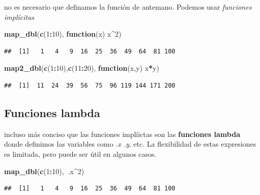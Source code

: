\documentclass[]{book}
\newenvironment{Shaded}{\begin{snugshade}}{\end{snugshade}}
\newcommand{\ControlFlowTok}[1]{\textcolor[rgb]{0.13,0.29,0.53}{\textbf{#1}}}
\newcommand{\DecValTok}[1]{\textcolor[rgb]{0.00,0.00,0.81}{#1}}
\newcommand{\KeywordTok}[1]{\textcolor[rgb]{0.13,0.29,0.53}{\textbf{#1}}}
\newcommand{\NormalTok}[1]{#1}
\newcommand{\OperatorTok}[1]{\textcolor[rgb]{0.81,0.36,0.00}{\textbf{#1}}}
\begin{document}
no es necesario que definamos la función de antemano. Podemos usar \emph{funciones implícitas}

\begin{Shaded}
\begin{Highlighting}[]
\KeywordTok{map_dbl}\NormalTok{(}\KeywordTok{c}\NormalTok{(}\DecValTok{1}\OperatorTok{:}\DecValTok{10}\NormalTok{), }\ControlFlowTok{function}\NormalTok{(x) x}\OperatorTok{^}\DecValTok{2}\NormalTok{)}
\end{Highlighting}
\end{Shaded}

\begin{verbatim}
##  [1]   1   4   9  16  25  36  49  64  81 100
\end{verbatim}

\begin{Shaded}
\begin{Highlighting}[]
\KeywordTok{map2_dbl}\NormalTok{(}\KeywordTok{c}\NormalTok{(}\DecValTok{1}\OperatorTok{:}\DecValTok{10}\NormalTok{),}\KeywordTok{c}\NormalTok{(}\DecValTok{11}\OperatorTok{:}\DecValTok{20}\NormalTok{), }\ControlFlowTok{function}\NormalTok{(x,y) x}\OperatorTok{*}\NormalTok{y)}
\end{Highlighting}
\end{Shaded}

\begin{verbatim}
##  [1]  11  24  39  56  75  96 119 144 171 200
\end{verbatim}

\hypertarget{funciones-lambda}{%
\subsection{Funciones lambda}\label{funciones-lambda}}

incluso más conciso que las funciones implíictas son las \textbf{funciones lambda} donde definimos las variables como \emph{.x} \emph{.y}, etc. La flexibilidad de estas expresiones es limitada, pero puede ser útil en algunos casos.

\begin{Shaded}
\begin{Highlighting}[]
\KeywordTok{map_dbl}\NormalTok{(}\KeywordTok{c}\NormalTok{(}\DecValTok{1}\OperatorTok{:}\DecValTok{10}\NormalTok{),}\OperatorTok{~}\NormalTok{.x}\OperatorTok{^}\DecValTok{2}\NormalTok{)}
\end{Highlighting}
\end{Shaded}

\begin{verbatim}
##  [1]   1   4   9  16  25  36  49  64  81 100
\end{verbatim}
\end{document}
